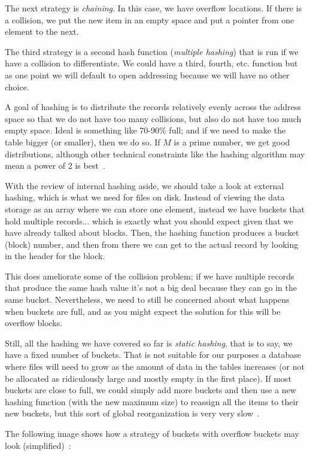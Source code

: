 \documentclass[a4paper]{report}
\begin{document}
The next strategy is \textit{chaining}. In this case, we have overflow locations. If there is a collision, we put the new item in an empty space and put a pointer from one element to the next. 

The third strategy is a second hash function (\textit{multiple hashing}) that is run if we have a collision to differentiate. We could have a third, fourth, etc. function but as one point we will default to open addressing because we will have no other choice.

A goal of hashing is to distribute the records relatively evenly across the address space so that we do not have too many collisions, but also do not have too much empty space. Ideal is something like 70-90\% full; and if we need to make the table bigger (or smaller), then we do so. If $M$ is a prime number, we get good distributions, although other technical constraints like the hashing algorithm may mean a power of 2 is best~\cite{fds}.

With the review of internal hashing aside, we should take a look at external hashing, which is what we need for files on disk. Instead of viewing the data storage as an array  where we can store one element, instead we have buckets that hold multiple records... which is exactly what you should expect given that we have already talked about blocks. Then, the hashing function produces a bucket (block) number, and then from there we can get to the actual record by looking in the header for the block. 

This does ameliorate some of the collision problem; if we have multiple records that produce the same hash value it's not a big deal because they can go in the same bucket. Nevertheless, we need to still be concerned about what happens when buckets are full, and as you might expect the solution for this will be overflow blocks. 

Still, all the hashing we have covered so far is \textit{static hashing}, that is to say, we have a fixed number of buckets. That is not suitable for our purposes a database where files will need to grow as the amount of data in the tables increases (or not be allocated as ridiculously large and mostly empty in the first place). If most buckets are close to full, we could simply add more buckets and then use a new hashing function (with the new maximum size) to reassign all the items to their new buckets, but this sort of global reorganization is very very slow~\cite{fds}.

The following image shows how a strategy of buckets with overflow buckets may look (simplified)~\cite{fds}:
\end{document}
